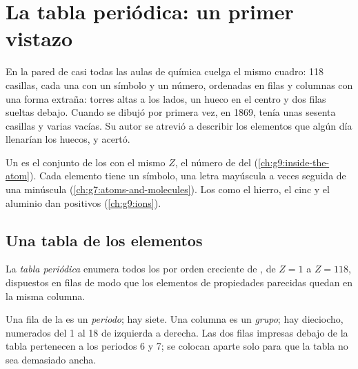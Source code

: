 \chapter{La tabla periódica: un primer vistazo}\label{ch:g9:periodic-table-first-look}

En la pared de casi todas las aulas de química cuelga el mismo cuadro:
118 casillas, cada una con un símbolo y un número, ordenadas en filas y
columnas con una forma extraña: torres altas a los lados, un hueco en
el centro y dos filas sueltas debajo. Cuando se dibujó por primera vez,
en 1869, tenía unas sesenta casillas y varias vacías. Su autor se atrevió
a describir los elementos que algún día llenarían los huecos, y acertó.

\begin{recall}
Un  es el conjunto de los  con el mismo  $Z$, el número de  del  (\cref{ch:g9:inside-the-atom}).
Cada elemento tiene un símbolo, una letra mayúscula a veces seguida de
una minúscula (\cref{ch:g7:atoms-and-molecules}). Los  como el
hierro, el cinc y el aluminio dan  positivos (\cref{ch:g9:ions}).
\end{recall}

\section{Una tabla de los elementos}

\begin{definition}\label{def:g9:periodic-table-first-look:periodic-table}
La \emph{tabla periódica} enumera todos los
 por orden creciente de , de $Z = 1$ a
$Z = 118$, dispuestos en filas de modo que los elementos de propiedades
parecidas quedan en la misma columna.
\end{definition}

\begin{definition}\label{def:g9:periodic-table-first-look:period}
Una fila de la  es un \emph{periodo}; hay
siete. Una columna es un \emph{grupo}; hay dieciocho,
numerados del 1 al 18 de izquierda a derecha. Las dos filas impresas
debajo de la tabla pertenecen a los periodos 6 y 7; se colocan aparte
solo para que la tabla no sea demasiado ancha.
\end{definition}

